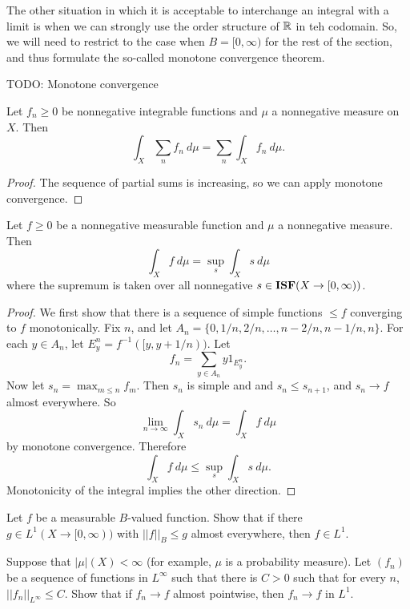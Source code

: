 \begin{subsec}
The other situation in which it is acceptable to interchange an integral with a limit is when we can strongly use the order structure of $\mathbb{R}$ in teh codomain.
So, we will need to restrict to the case when $B = [0, \infty)$ for the rest of the section, and thus formulate the so-called monotone convergence theorem.
\end{subsec}

TODO: Monotone convergence

\begin{corollary}
\label{positive summation}
Let $f_{n} \geq 0$ be nonnegative integrable functions and $\mu$ a nonnegative measure on $X$. Then
\[\int_{X} \sum_{n} f_{n}~d\mu = \sum_{n} \int_{X} f_{n}~d\mu.\]
\end{corollary}
\begin{proof}
The sequence of partial sums is increasing, so we can apply monotone convergence.
\end{proof}

\begin{corollary}
Let $f \geq 0$ be a nonnegative measurable function and $\mu$ a nonnegative measure. Then
\[\int_{X} f~d\mu = \sup_{s} \int_{X} s~d\mu\]
where the supremum is taken over all nonnegative $s \in \mathbf{ISF}(X \to [0, \infty))$.
\end{corollary}
\begin{proof}
We first show that there is a sequence of simple functions $\leq f$ converging to $f$ monotonically.
Fix $n$, and let $A_{n} = \{0, 1/n, 2/n, \dots, n - 2/n, n - 1/n, n\}$.
For each $y \in A_{n}$, let $E_y^{n} = f^{-1}([y, y + 1/n))$. Let
\[f_{n} = \sum_{y \in A_{n}} y1_{E_y^n}.\]
Now let $s_{n} = \max_{m \leq n} f_{m}$.
Then $s_{n}$ is simple and and $s_{n} \leq s_{n+1}$, and $s_{n} \to f$ almost everywhere.
So
\[\lim_{n \to \infty} \int_{X} s_{n}~d\mu = \int_{X} f~d\mu\]
by monotone convergence. Therefore
\[\int_{X} f~d\mu \leq \sup_{s} \int_{X} s~d\mu.\]
Monotonicity of the integral implies the other direction.
\end{proof}


\begin{exercise}
Let $f$ be a measurable $B$-valued function. Show that if there $g \in L^1(X \to [0, \infty))$ with $||f||_{B} \leq g$ almost everywhere, then $f \in L^1$.
\end{exercise}

\begin{exercise}
Suppose that $|\mu|(X) < \infty$ (for example, $\mu$ is a probability measure). Let $(f_{n})$ be a sequence of functions in $L^\infty$ such that there is $C > 0$ such that for every $n$, $||f_{n}||_{L^\infty} \leq C$.
Show that if $f_{n} \to f$ almost pointwise, then $f_{n} \to f$ in $L^1$.
\end{exercise}

